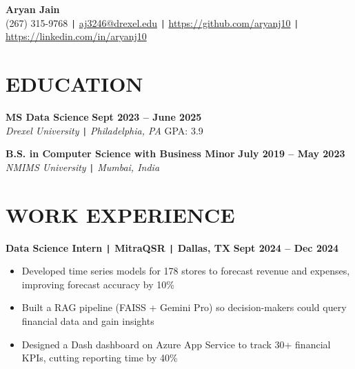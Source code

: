 \documentclass[10pt]{article}
\begin{document}
\begin{center}
    \textbf{\fontsize{18}{18}\selectfont Aryan Jain} \\
    (267) 315-9768 \texttt{|} \href{mailto:aj3246@drexel.edu}{aj3246@drexel.edu} \texttt{|}
    \href{https://github.com/aryanj10}{https://github.com/aryanj10} \texttt{|}  
    \href{https://linkedin.com/in/aryanj10}{https://linkedin.com/in/aryanj10}
\end{center}

\vspace{-0.7cm}
\section*{EDUCATION} 
\vspace{-0.2cm} 

\noindent 
\textbf{MS Data Science} \hfill \textbf{Sept 2023 -- June 2025} \\
\textit{Drexel University} \texttt{|} \textit{Philadelphia, PA} \hfill GPA: 3.9

\noindent 
\textbf{B.S. in Computer Science with Business Minor} \hfill \textbf{July 2019 --  May 2023} \\
\textit{NMIMS University} \texttt{|} \textit{Mumbai, India} 



\vspace{-0.4cm}
\section*{WORK EXPERIENCE}

\vspace{-0.2cm}
\noindent
\textbf{Data Science Intern \texttt{|} MitraQSR \texttt{|} Dallas, TX} \hfill \textbf{Sept 2024 -- Dec 2024} 
\vspace{-0.15cm}
\begin{itemize}[leftmargin=0.5cm, itemsep=0pt]

    \item Developed time series models for 178 stores to forecast revenue and expenses, improving forecast accuracy by 10\%

    \item Built a RAG pipeline (FAISS + Gemini Pro) so decision-makers could query financial data and gain insights

    \item Designed a Dash dashboard on Azure App Service to track 30+ financial KPIs, cutting reporting time by 40\%

\end{itemize}
\end{document}
